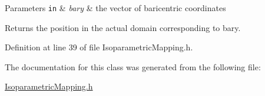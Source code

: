 \begin{DoxyParams}[1]{Parameters}
\mbox{\tt in}  & {\em bary} & the vector of baricentric coordinates \\
\hline
\end{DoxyParams}
\begin{DoxyReturn}{Returns}
the position in the actual domain corresponding to bary.
\end{DoxyReturn}


Definition at line 39 of file Isoparametric\+Mapping.\+h.



The documentation for this class was generated from the following file\+:\begin{DoxyCompactItemize}
\item 
\hyperlink{_isoparametric_mapping_8h}{Isoparametric\+Mapping.\+h}\end{DoxyCompactItemize}
